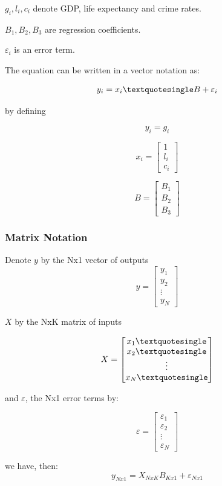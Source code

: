 \documentclass{article} %
\begin{document}
\(g_i, l_i, c_i\) denote GDP, life expectancy and crime rates.


\(B_1, B_2, B_3\) are regression coefficients.


\(\varepsilon_i\) is an error term.

The equation can be written in a vector notation as:

\[y_i = x_i\textquotesingle B + \varepsilon_i\]

by defining


\[y_i = g_i\]

\[x_i = \begin{bmatrix} 1 \\ l_i\\ c_i \end{bmatrix}\]

\[B = \begin{bmatrix} B_1\\B_2\\B_3\end{bmatrix}\]

\subsubsection{Matrix Notation}


Denote \(y\) by the Nx1 vector of outputs 
\[y= \begin{bmatrix} y_1\\y_2\\ \vdots\\y_N\end{bmatrix}\]

\(X\) by the NxK matrix of inputs

\[X = \begin{bmatrix} x_1\textquotesingle\\x_2\textquotesingle\\\vdots\\x_N\textquotesingle\end{bmatrix}\]

and \(\varepsilon\), the Nx1 error terms by:

\[\varepsilon = \begin{bmatrix} \varepsilon_1\\\varepsilon_2\\\vdots\\\varepsilon_N\end{bmatrix}\]

we have, then:
\[y_{Nx1} = X_{NxK}B_{Kx1} + \varepsilon_{Nx1}\]
\end{document}
